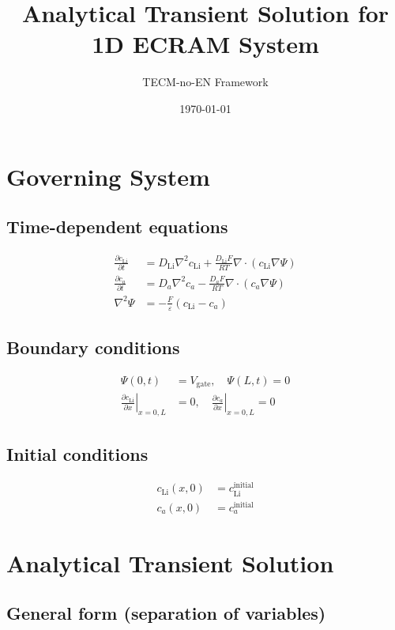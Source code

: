 \documentclass[11pt]{article}
\title{Analytical Transient Solution for 1D ECRAM System}
\author{TECM-no-EN Framework}
\date{\today}
\begin{document}
\maketitle

\section{Governing System}

\subsection{Time-dependent equations}
\begin{align}
\frac{\partial c_{\text{Li}}}{\partial t} &= D_{\text{Li}} \nabla^2 c_{\text{Li}} + \frac{D_{\text{Li}} F}{RT} \nabla \cdot (c_{\text{Li}} \nabla \Psi) \\
\frac{\partial c_a}{\partial t} &= D_a \nabla^2 c_a - \frac{D_a F}{RT} \nabla \cdot (c_a \nabla \Psi) \\
\nabla^2 \Psi &= -\frac{F}{\varepsilon}(c_{\text{Li}} - c_a)
\end{align}

\subsection{Boundary conditions}
\begin{align}
\Psi(0,t) &= V_{\text{gate}}, \quad \Psi(L,t) = 0 \\
\left.\frac{\partial c_{\text{Li}}}{\partial x}\right|_{x=0,L} &= 0, \quad \left.\frac{\partial c_a}{\partial x}\right|_{x=0,L} = 0
\end{align}

\subsection{Initial conditions}
\begin{align}
c_{\text{Li}}(x,0) &= c_{\text{Li}}^{\text{initial}} \\
c_a(x,0) &= c_a^{\text{initial}}
\end{align}

\section{Analytical Transient Solution}

\subsection{General form (separation of variables)}
\end{document}
